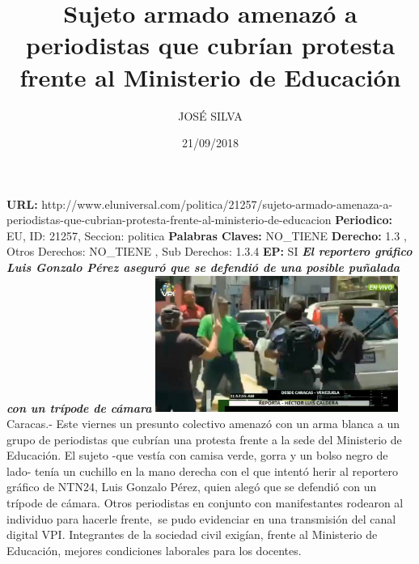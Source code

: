 \documentclass{article}%
\title{\textbf{Sujeto armado amenazó a periodistas que cubrían protesta frente al Ministerio de Educación}}%
\author{JOSÉ SILVA}%
\date{21/09/2018}%
\begin{document}
%
\normalsize%
\maketitle%
\textbf{URL: }%
http://www.eluniversal.com/politica/21257/sujeto{-}armado{-}amenaza{-}a{-}periodistas{-}que{-}cubrian{-}protesta{-}frente{-}al{-}ministerio{-}de{-}educacion\newline%
%
\textbf{Periodico: }%
EU, %
ID: %
21257, %
Seccion: %
politica\newline%
%
\textbf{Palabras Claves: }%
NO\_TIENE\newline%
%
\textbf{Derecho: }%
1.3%
, Otros Derechos: %
NO\_TIENE%
, Sub Derechos: %
1.3.4%
\newline%
%
\textbf{EP: }%
SI\newline%
\newline%
%
\textbf{\textit{El reportero gráfico Luis Gonzalo Pérez aseguró que se defendió de una posible puñalada con un trípode de cámara}}%
\newline%
\newline%
%
\includegraphics[width=300px]{180.jpg}%
\newline%
%
Caracas.{-} Este viernes un presunto colectivo amenazó con un arma blanca a un grupo de periodistas que cubrían una protesta frente a la sede del Ministerio de Educación.%
\newline%
%
El sujeto {-}que vestía con camisa verde, gorra y un bolso negro de lado{-} tenía un cuchillo en la mano derecha con el que intentó herir al reportero gráfico de NTN24, Luis Gonzalo Pérez, quien alegó que se defendió con un trípode de cámara.%
\newline%
%
Otros periodistas en conjunto con manifestantes rodearon al individuo para hacerle frente,~se pudo evidenciar en una transmisión del canal digital VPI.%
\newline%
%
Integrantes de la sociedad civil exigían, frente al Ministerio de Educación, mejores condiciones laborales para los docentes.%
\newline%
%
\end{document}
